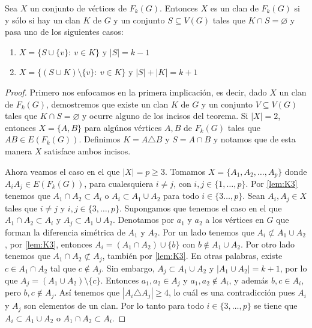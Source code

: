     \begin{teorema}
    \label{teo:clanG-clanFG}
        Sea $X$ un conjunto de v\'ertices de $F_k(G)$. Entonces $X$ es un clan
        de $F_k(G)$ si y s\'olo si hay un clan $K$ de $G$ y un conjunto $S
        \subseteq V(G)$ tales que $K \cap S = \varnothing$ y pasa uno de los
        siguientes casos:
        \begin{enumerate}
            \item $X = \{S \cup \{v\}\colon\ v \in K\}$ y $|S| = k-1$
            \item $X = \{(S\cup K) \setminus \{v\}\colon\ v \in K \}$ y $|S| + |K| =
            k+1$
        \end{enumerate}
    \end{teorema}

    \begin{proof}
        Primero nos enfocamos en la primera implicaci\'on, es decir, dado $X$ un
        clan de $F_k(G)$, demostremos que existe un clan $K$ de $G$ y un
        conjunto $V \subseteq V(G)$ tales que $K \cap S = \varnothing$ y ocurre
        alguno de los incisos del teorema. Si $|X|=2$, entonces $X= \{A, B\}$
        para alg\'unos v\'ertices $A, B$ de $F_k(G)$ tales que $AB \in
        E(F_k(G))$. Definimos $K = A \triangle B$ y $S=A \cap B$ y notamos que
        de esta manera $X$ satisface ambos incisos.

        Ahora veamos el caso en el que $|X|= p \geq 3$. Tomamos $X=\{A_1, A_2,
        \dots, A_p\}$ donde $A_i{A_j} \in E(F_k(G))$, para cualesquiera $i\neq
        j$, con $i,j \in \{1, \dots, p\}$. Por \cref{lem:K3} tenemos que $A_1\cap A_2 \subset A_i$ o $A_i \subset A_1 \cup
        A_2$ para todo $i \in \{3 \dots,p \}$. Sean $A_i, A_j \in X$ tales que
        $i \neq j$ y $i, j \in \{3, \dots, p\}$. Supongamos que tenemos el caso
        en el que $A_1\cap A_2 \subset A_i$ y $A_j \subset A_1 \cup A_2$.
        Denotamos por $a_1$ y $a_2$ a los v\'ertices en $G$ que forman la
        diferencia sim\'etrica de $A_1$ y $A_2$. Por un lado tenemos que $A_i
        \not\subset A_1\cup A_2$, por \cref{lem:K3},
        entonces $A_i = (A_1\cap A_2) \cup \{b\}$ con $b \notin A_1\cup A_2$.
        Por otro lado tenemos que $A_1 \cap A_2 \not\subset A_j$, tambi\'en por
        \cref{lem:K3}. En otras palabras, existe $c \in
        A_1 \cap A_2$ tal que $c \notin A_j$. Sin embargo, $A_j \subset A_1 \cup
        A_2$ y $|A_1 \cup A_2| =k+1$, por lo que $A_j = (A_1 \cup A_2)\setminus
        \{c\}$. Entonces $a_1, a_2 \in A_j$ y $a_1, a_2 \notin A_i$, y adem\'as
        $b, c \in A_i$, pero $b, c \notin A_j$. As\'i tenemos que $|A_i
        \triangle A_j| \geq 4$, lo cu\'al es una contradicci\'on pues $A_i$ y
        $A_j$ son elementos de un clan. Por lo tanto para todo $i\in \{3, \dots,
        p\}$ se tiene que $A_i \subset A_1\cup A_2$ o $A_1 \cap A_2 \subset
        A_i$.


\end{proof}
